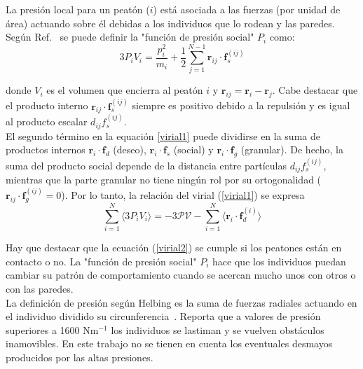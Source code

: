 La presión local para un peatón ($i$) está asociada a las fuerzas (por unidad de área) actuando sobre él debidas a los individuos que lo rodean y las paredes. Según Ref.~\cite{lion} se puede definir la "función de presión social" $P_i$ como:\\

\begin{equation}
3P_iV_i=\displaystyle\frac{p_i^2}{m_i} + \frac{1}{2}
\displaystyle\sum_{j=1}^{N-1}
\mathbf{r}_{ij}\cdot\mathbf{f}_s^{(ij)}\label{pv}
\end{equation}

\noindent donde $V_i$ es el volumen que encierra al peatón $i$ y 
$\mathbf{r}_{ij}=\mathbf{r}_{i}-\mathbf{r}_j$. Cabe destacar que el producto interno $\mathbf{r}_{ij}\cdot\mathbf{f}_s^{(ij)}$ siempre es positivo debido a la repulsión y es igual al producto escalar $d_{ij}f_s^{(ij)}$.  \\ 

El segundo término en la equación \ref{virial1} puede dividirse en la suma de productos internos $\mathbf{r}_i\cdot\mathbf{f}_d$ (deseo), 
$\mathbf{r}_i\cdot\mathbf{f}_s$ (social) y $\mathbf{r}_i\cdot\mathbf{f}_g$ (granular). De hecho, la suma del producto social depende de la distancia entre partículas $d_{ij}f_s^{(ij)}$, mientras que la parte granular no tiene ningún rol por su ortogonalidad ($\mathbf{r}_{ij}\cdot\mathbf{f}_g^{(ij)}=0$). Por lo tanto, la relación del virial (\ref{virial1}) se expresa \\  


\begin{equation}
 \displaystyle\sum_{i=1}^N\langle3P_iV_i 
\rangle=-3\mathcal{PV} -\displaystyle\sum_{i=1}^N \langle
\mathbf{r}_i\cdot\mathbf{f}_d^{(i)}\rangle\label{virial2}
\end{equation}

Hay que destacar que la ecuación (\ref{virial2}) se cumple si los peatones están en contacto o no. La "función de presión social" $P_i$ hace que los individuos puedan cambiar su patrón de comportamiento cuando se acercan mucho unos con otros o con las paredes. \\ 

La definición de presión según Helbing es la suma de fuerzas radiales actuando en el individuo dividido su circunferencia~\cite{Helbing1}. Reporta que a valores de presión superiores a 1600 Nm$^{-1}$ los individuos se lastiman y se vuelven obstáculos inamovibles. En este trabajo no se tienen en cuenta los eventuales desmayos producidos por las altas presiones. 


